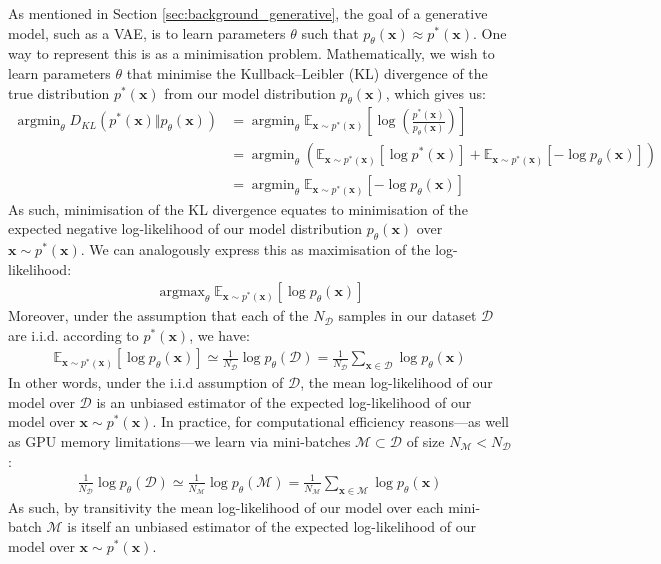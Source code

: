\documentclass[ oneside,%
                    author={George Herbert},
                    degree={MSci},
                     title={Video Diffusion Models for Climate Simulations},
                  subtitle={}]{dissertation}
\begin{document}
As mentioned in Section \ref{sec:background_generative}, the goal of a generative model, such as a VAE, is to learn parameters $\theta$ such that $p_\theta(\mathbf{x})\approx p^*(\mathbf{x})$. One way to represent this is as a minimisation problem. Mathematically, we wish to learn parameters $\theta$ that minimise the Kullback--Leibler (KL) divergence of the true distribution $p^*(\mathbf{x})$ from our model distribution $p_\theta(\mathbf{x})$, which gives us:
\begin{align}
      \operatorname{argmin}_{\theta} D_{KL}(p^*(\mathbf{x})\Vert p_\theta(\mathbf{x}))&=\operatorname{argmin}_{\theta}\mathbb{E}_{\mathbf{x}\sim p^*(\mathbf{x})}\left[\log\left(\frac{p^*(\mathbf{x})}{p_\theta(\mathbf{x})}\right)\right]\\
      &=\operatorname{argmin}_{\theta}\left(\mathbb{E}_{\mathbf{x}\sim p^*(\mathbf{x})}\left[\log p^*(\mathbf{x})\right]+\mathbb{E}_{\mathbf{x}\sim p^*(\mathbf{x})}\left[-\log p_\theta(\mathbf{x})\right]\right)\\
      &=\operatorname{argmin}_{\theta}\mathbb{E}_{\mathbf{x}\sim p^*(\mathbf{x})}\left[-\log p_\theta(\mathbf{x})\right]
\end{align}
As such, minimisation of the KL divergence equates to minimisation of the expected negative log-likelihood of our model distribution $p_\theta(\mathbf{x})$ over $\mathbf{x}\sim p^*(\mathbf{x})$. We can analogously express this as maximisation of the log-likelihood:
\begin{align}
      \operatorname{argmax}_{\theta}\mathbb{E}_{\mathbf{x}\sim p^*(\mathbf{x})}\left[\log p_\theta(\mathbf{x})\right]
\end{align}
Moreover, under the assumption that each of the $N_\mathcal{D}$ samples in our dataset $\mathcal{D}$ are i.i.d. according to $p^*(\mathbf{x})$, we have:
\begin{align}
      \mathbb{E}_{\mathbf{x}\sim p^*(\mathbf{x})}\left[\log p_\theta(\mathbf{x})\right]\simeq \frac{1}{N_{\mathcal{D}}}\log p_\theta(\mathcal{D}) = \frac{1}{N_{\mathcal{D}}} \sum_{\mathbf{x}\in\mathcal{D}} \log p_\theta(\mathbf{x})
\end{align}
In other words, under the i.i.d assumption of $\mathcal{D}$, the mean log-likelihood of our model over $\mathcal{D}$ is an unbiased estimator of the expected log-likelihood of our model over $\mathbf{x}\sim p^*(\mathbf{x})$. In practice, for computational efficiency reasons---as well as GPU memory limitations---we learn via mini-batches $\mathcal{M}\subset \mathcal{D}$ of size $N_\mathcal{M} < N_\mathcal{D}$:
\begin{align}
      \frac{1}{N_\mathcal{D}}\log p_\theta(\mathcal{D})\simeq \frac{1}{N_\mathcal{M}}\log p_\theta(\mathcal{M})=\frac{1}{N_\mathcal{M}}\sum_{\mathbf{x}\in\mathcal{M}}\log p_\theta(\mathbf{x})
\end{align}
As such, by transitivity the mean log-likelihood of our model over each mini-batch $\mathcal{M}$ is itself an unbiased estimator of the expected log-likelihood of our model over $\mathbf{x}\sim p^*(\mathbf{x})$.
\end{document}
